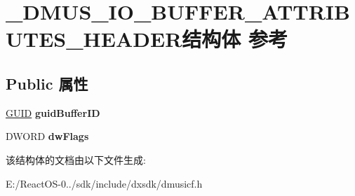 \hypertarget{struct___d_m_u_s___i_o___b_u_f_f_e_r___a_t_t_r_i_b_u_t_e_s___h_e_a_d_e_r}{}\section{\+\_\+\+D\+M\+U\+S\+\_\+\+I\+O\+\_\+\+B\+U\+F\+F\+E\+R\+\_\+\+A\+T\+T\+R\+I\+B\+U\+T\+E\+S\+\_\+\+H\+E\+A\+D\+E\+R结构体 参考}
\label{struct___d_m_u_s___i_o___b_u_f_f_e_r___a_t_t_r_i_b_u_t_e_s___h_e_a_d_e_r}
\subsection*{Public 属性}
\begin{DoxyCompactItemize}
\item 
\mbox{\label{struct___d_m_u_s___i_o___b_u_f_f_e_r___a_t_t_r_i_b_u_t_e_s___h_e_a_d_e_r_a1c518ae1bbf043e747f4fc1b7b01099f}} 
\hyperlink{interface_g_u_i_d}{G\+U\+ID} {\bfseries guid\+Buffer\+ID}
\item 
\mbox{\label{struct___d_m_u_s___i_o___b_u_f_f_e_r___a_t_t_r_i_b_u_t_e_s___h_e_a_d_e_r_ae8f9c3bb97b93eaf7adda47ae5df604d}} 
D\+W\+O\+RD {\bfseries dw\+Flags}
\end{DoxyCompactItemize}


该结构体的文档由以下文件生成\+:\begin{DoxyCompactItemize}
\item 
E\+:/\+React\+O\+S-\/0../sdk/include/dxsdk/dmusicf.\+h\end{DoxyCompactItemize}
